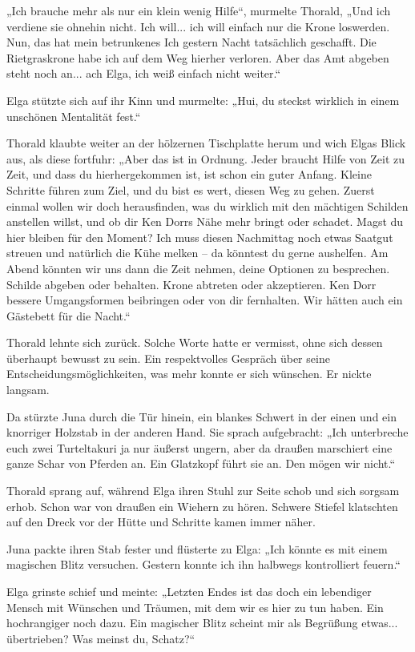 \documentclass[10pt, a4paper, oneside]{book}
\begin{document}
„Ich brauche mehr als nur ein klein wenig Hilfe“, murmelte Thorald, „Und ich verdiene sie ohnehin nicht. Ich will... ich will einfach nur die Krone loswerden. Nun, das hat mein betrunkenes Ich gestern Nacht tatsächlich geschafft. Die Rietgraskrone habe ich auf dem Weg hierher verloren. Aber das Amt abgeben steht noch an... ach Elga, ich weiß einfach nicht weiter.“

Elga stützte sich auf ihr Kinn und murmelte: „Hui, du steckst wirklich in einem unschönen Mentalität fest.“

Thorald klaubte weiter an der hölzernen Tischplatte herum und wich Elgas Blick aus, als diese fortfuhr: „Aber das ist in Ordnung. Jeder braucht Hilfe von Zeit zu Zeit, und dass du hierhergekommen ist, ist schon ein guter Anfang. Kleine Schritte führen zum Ziel, und du bist es wert, diesen Weg zu gehen. Zuerst einmal wollen wir doch herausfinden, was du wirklich mit den mächtigen Schilden anstellen willst, und ob dir Ken Dorrs Nähe mehr bringt oder schadet. Magst du hier bleiben für den Moment? Ich muss diesen Nachmittag noch etwas Saatgut streuen und natürlich die Kühe melken – da könntest du gerne aushelfen. Am Abend könnten wir uns dann die Zeit nehmen, deine Optionen zu besprechen. Schilde abgeben oder behalten. Krone abtreten oder akzeptieren. Ken Dorr bessere Umgangsformen beibringen oder von dir fernhalten. Wir hätten auch ein Gästebett für die Nacht.“

Thorald lehnte sich zurück. Solche Worte hatte er vermisst, ohne sich dessen überhaupt bewusst zu sein. Ein respektvolles Gespräch über seine Entscheidungsmöglichkeiten, was mehr konnte er sich wünschen. Er nickte langsam.

Da stürzte Juna durch die Tür hinein, ein blankes Schwert in der einen und ein knorriger Holzstab in der anderen Hand. Sie sprach aufgebracht: „Ich unterbreche euch zwei Turteltakuri ja nur äußerst ungern, aber da draußen marschiert eine ganze Schar von Pferden an. Ein Glatzkopf führt sie an. Den mögen wir nicht.“

Thorald sprang auf, während Elga ihren Stuhl zur Seite schob und sich sorgsam erhob. Schon war von draußen ein Wiehern zu hören. Schwere Stiefel klatschten auf den Dreck vor der Hütte und Schritte kamen immer näher.

Juna packte ihren Stab fester und flüsterte zu Elga: „Ich könnte es mit einem magischen Blitz versuchen. Gestern konnte ich ihn halbwegs kontrolliert feuern.“

Elga grinste schief und meinte: „Letzten Endes ist das doch ein lebendiger Mensch mit Wünschen und Träumen, mit dem wir es hier zu tun haben. Ein hochrangiger noch dazu. Ein magischer Blitz scheint mir als Begrüßung etwas... übertrieben? Was meinst du, Schatz?“
\end{document}
